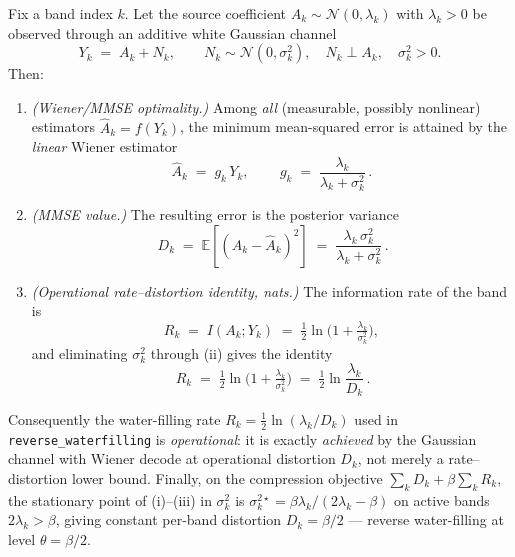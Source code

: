 \begin{theorem}
\label{thm:wiener-rd}
Fix a band index $k$. Let the source coefficient $A_k \sim \mathcal{N}(0,\lambda_k)$ with $\lambda_k>0$ be observed through an additive white Gaussian channel
\[
Y_k \;=\; A_k + N_k, \qquad N_k \sim \mathcal{N}(0,\sigma_k^2), \quad N_k \perp A_k, \quad \sigma_k^2>0 .
\]
Then:
\begin{enumerate}
\item[\textup{(i)}] \emph{(Wiener/MMSE optimality.)} Among \emph{all} (measurable, possibly nonlinear) estimators $\hat A_k=f(Y_k)$, the minimum mean-squared error is attained by the \emph{linear} Wiener estimator
\[
\hat A_k \;=\; g_k\,Y_k, \qquad
\boxed{\,g_k \;=\; \frac{\lambda_k}{\lambda_k+\sigma_k^2}\,}.
\]
\item[\textup{(ii)}] \emph{(MMSE value.)} The resulting error is the posterior variance
\[
\boxed{\,D_k \;=\; \mathbb{E}\!\left[(A_k-\hat A_k)^2\right] \;=\; \frac{\lambda_k\,\sigma_k^2}{\lambda_k+\sigma_k^2}\,}.
\]
\item[\textup{(iii)}] \emph{(Operational rate--distortion identity, nats.)} The information rate of the band is
\[
R_k \;=\; I(A_k;Y_k) \;=\; \tfrac12\ln\!\Big(1+\tfrac{\lambda_k}{\sigma_k^2}\Big),
\]
and eliminating $\sigma_k^2$ through (ii) gives the identity
\[
\boxed{\,R_k \;=\; \tfrac12\ln\!\Big(1+\tfrac{\lambda_k}{\sigma_k^2}\Big) \;=\; \tfrac12\ln\!\frac{\lambda_k}{D_k}\,}.
\]
\end{enumerate}
Consequently the water-filling rate $R_k=\tfrac12\ln(\lambda_k/D_k)$ used in \texttt{reverse\_waterfilling} is \emph{operational}: it is exactly \emph{achieved} by the Gaussian channel with Wiener decode at operational distortion $D_k$, not merely a rate--distortion lower bound. Finally, on the compression objective $\sum_k D_k+\beta\sum_k R_k$, the stationary point of (i)--(iii) in $\sigma_k^2$ is $\sigma_k^{2\star}=\beta\lambda_k/(2\lambda_k-\beta)$ on active bands $2\lambda_k>\beta$, giving constant per-band distortion $D_k=\beta/2$ --- reverse water-filling at level $\theta=\beta/2$.
\end{theorem}

